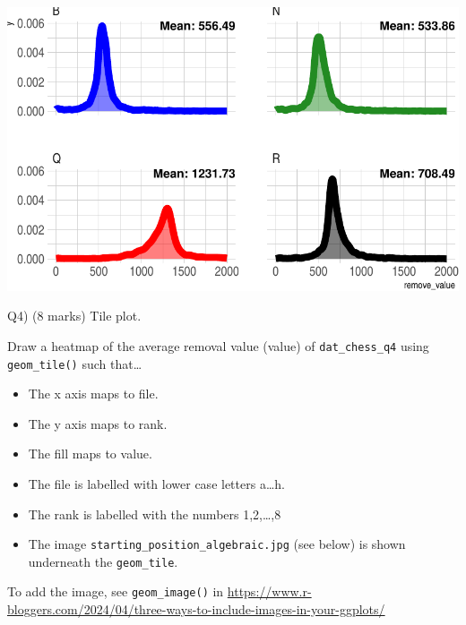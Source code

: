 \documentclass[
]{article}
\providecommand{\tightlist}{%
  \setlength{\itemsep}{0pt}\setlength{\parskip}{0pt}}
\begin{document}
\includegraphics{STAT842_Assignment2_files/figure-latex/unnamed-chunk-5-1.pdf}

\newpage

Q4) (8 marks) Tile plot.

Draw a heatmap of the average removal value (value) of
\texttt{dat\_chess\_q4} using \texttt{geom\_tile()} such that\ldots{}

\begin{itemize}
\tightlist
\item
  The x axis maps to file.
\item
  The y axis maps to rank.
\item
  The fill maps to value.
\item
  The file is labelled with lower case letters a\ldots h.
\item
  The rank is labelled with the numbers 1,2,\ldots,8
\item
  The image \texttt{starting\_position\_algebraic.jpg} (see below) is
  shown underneath the \texttt{geom\_tile}.
\end{itemize}

To add the image, see \texttt{geom\_image()} in
\url{https://www.r-bloggers.com/2024/04/three-ways-to-include-images-in-your-ggplots/}
\end{document}
